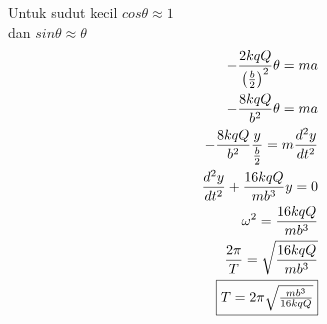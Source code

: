 \begin{enumerate}
\begin{minipage}{0.5\textwidth}
    \end{minipage}
    \hfill
    \begin{minipage}{0.4\textwidth}
    Untuk sudut kecil $cos\theta \approx 1$ \\ dan $sin\theta \approx \theta$
    \begin{align*}
    -\frac{2kqQ}{\left ( \frac{b}{2} \right )^{2}}\theta=ma \\
    -\frac{8kqQ}{b^{2}}\theta=ma \\
    -\frac{8kqQ}{b^{2}}\frac{y}{\frac{b}{2}}=m\frac{d^{2}y}{dt^{2}} \\
    \frac{d^{2}y}{dt^{2}}+\frac{16kqQ}{mb^{3}}y=0 \\
    \omega^{2}=\frac{16kqQ}{mb^{3}}\\
    \frac{2\pi}{T}=\sqrt{\frac{16kqQ}{mb^{3}}}\\
    \fbox{$T=2\pi\sqrt{\frac{mb^{3}}{16kqQ}}$}
    \end{align*}
    \end{minipage}
\end{enumerate}
